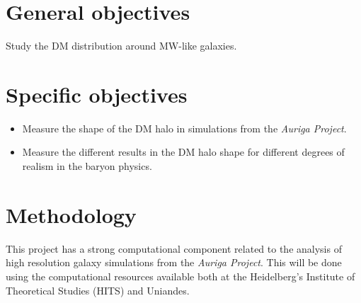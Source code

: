 \documentclass[12pt]{article}
\begin{document}
\section{General objectives}


Study the DM distribution around MW-like galaxies.

\section{Specific objectives}


\begin{itemize}
	\item Measure the shape of the DM halo in simulations from the \emph{Auriga Project}.

	\item Measure the different results in the DM halo shape for different degrees of realism in the baryon physics.	
\end{itemize}

\section{Methodology}




This project has a strong computational component related to the analysis of high resolution galaxy simulations from the \emph{Auriga Project}. 
This will be done using the computational resources available both at the Heidelberg's Institute of Theoretical Studies (HITS) and Uniandes.
\end{document}
